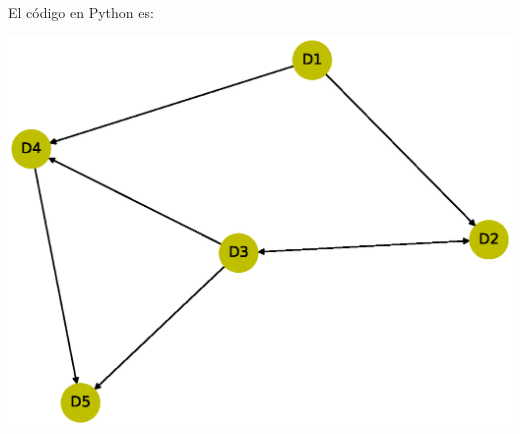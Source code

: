 \documentclass[10pt,a4paper]{article}
\begin{document}
El código en Python es:



\begin{center}

\includegraphics[scale=0.4]{MDR}

\end{center} 




\end{document}
